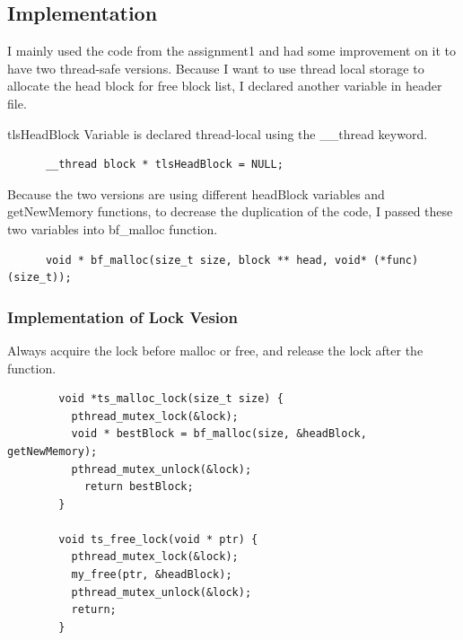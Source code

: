 \documentclass[a4paper,10pt]{article}
\begin{document}
    \subsection{Implementation}
    \par I mainly used the code from the assignment1 and had some improvement on it to
    have two thread-safe versions. Because I want to use thread local storage to allocate
    the head block for free block list, I declared another variable in header file.
    \par tlsHeadBlock Variable is declared thread-local using the \_\_thread keyword.
      \begin{lstlisting}
      __thread block * tlsHeadBlock = NULL;
      \end{lstlisting}
    \par Because the two versions are using different headBlock variables and getNewMemory
    functions, to decrease the duplication of the code, I passed these two variables into 
    bf\_malloc function.
      \begin{lstlisting}
      void * bf_malloc(size_t size, block ** head, void* (*func)(size_t));
      \end{lstlisting}

    \subsubsection{Implementation of Lock Vesion}
    \par Always acquire the lock before malloc or free, and release the lock after the function.
      \begin{lstlisting}
        void *ts_malloc_lock(size_t size) {
          pthread_mutex_lock(&lock);
          void * bestBlock = bf_malloc(size, &headBlock, getNewMemory);
          pthread_mutex_unlock(&lock);
            return bestBlock;
        }

        void ts_free_lock(void * ptr) {
          pthread_mutex_lock(&lock);
          my_free(ptr, &headBlock);
          pthread_mutex_unlock(&lock);
          return;
        }
      \end{lstlisting}
\end{document}
